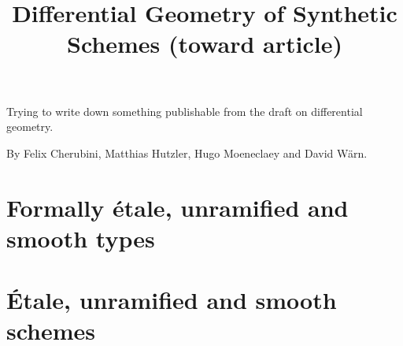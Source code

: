 \documentclass{../util/zariski}
\title{Differential Geometry of Synthetic Schemes (toward article)}
\begin{document}
\maketitle

Trying to write down something publishable from the draft on differential geometry.

By Felix Cherubini, Matthias Hutzler, Hugo Moeneclaey and David Wärn.

\tableofcontents

\section{Formally étale, unramified and smooth types}


\section{Étale, unramified and smooth schemes}


\printindex

\printbibliography
\end{document}
